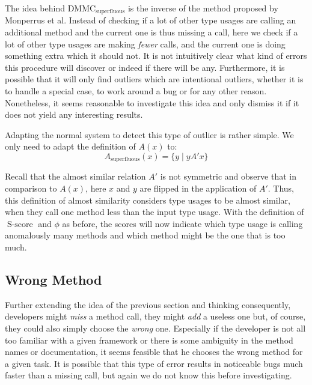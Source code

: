 The idea behind $\text{DMMC}_{\text{superfluous}}$ is the inverse of the method proposed by Monperrus et al.
Instead of checking if a lot of other type usages are calling an additional method and the current one is thus missing a call, here we check if a lot of other type usages are making \emph{fewer} calls, and the current one is doing something extra which it should not.
It is not intuitively clear what kind of errors this procedure will discover or indeed if there will be any.
Furthermore, it is possible that it will only find outliers which are intentional outliers, whether it is to handle a special case, to work around a bug or for any other reason.
Nonetheless, it seems reasonable to investigate this idea and only dismiss it if it does not yield any interesting results.

Adapting the normal system to detect this type of outlier is rather simple.
We only need to adapt the definition of $A(x)$ to:
\begin{equation*}
    A_{\text{superfluous}}(x) = \{y \mid yA'x \}
\end{equation*}

Recall that the almost similar relation $A'$ is not symmetric and observe that in comparison to $A(x)$, here $x$ and $y$ are flipped in the application of $A'$. 
Thus, this definition of almost similarity considers type usages to be almost similar, when they call one method less than the input type usage.
With the definition of $\operatorname{S-score}$ and $\phi$ as before, the scores will now indicate which type usage is calling anomalously many methods and which method might be the one that is too much.

\subsection{Wrong Method}

Further extending the idea of the previous section and thinking consequently, developers might \emph{miss} a method call, they might \emph{add} a useless one but, of course, they could also simply choose the \emph{wrong} one.
Especially if the developer is not all too familiar with a given framework or there is some ambiguity in the method names or documentation, it seems feasible that he chooses the wrong method for a given task.
It is possible that this type of error results in noticeable bugs much faster than a missing call, but again we do not know this before investigating.

